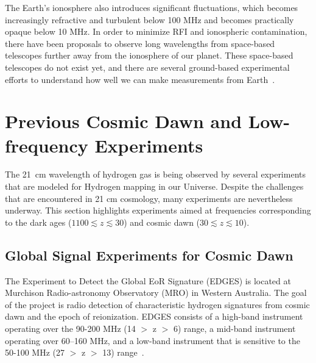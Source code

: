 	    The Earth's ionosphere also introduces significant fluctuations, which becomes increasingly refractive and turbulent below 100 MHz and becomes practically opaque below 10 MHz. In order to minimize RFI and ionospheric contamination, there have been proposals to observe long wavelengths from space-based telescopes further away from the ionosphere of our planet. These space-based telescopes do not exist yet, and there are several ground-based experimental efforts to understand how well we can make measurements from Earth~\citep{2019arXiv190710853C, 2019arXiv190804296K}. 
	    
	    \section{Previous Cosmic Dawn and Low-frequency Experiments}
	    
	    The \SI{21}{cm} wavelength of hydrogen gas is being observed by several experiments that are modeled for Hydrogen mapping in our Universe. Despite the challenges that are encountered in 21 cm cosmology, many experiments are nevertheless underway. This section highlights experiments aimed at frequencies corresponding to the dark ages ($1100 \lesssim z \lesssim 30$) and cosmic dawn ($30 \lesssim z \lesssim 10$).
	    
	    \subsection{Global Signal Experiments for Cosmic Dawn}

            
	    The Experiment to Detect the Global EoR Signature (EDGES) is located at Murchison Radio-astronomy Observatory (MRO) in Western Australia. The goal of the project is radio detection of characteristic hydrogen signatures from cosmic dawn and the epoch of reionization. EDGES consists of a high-band instrument operating over the 90-200 MHz (14 $>$ z $>$ 6) range, a mid-band instrument operating over 60–160 MHz, and a low-band instrument that is sensitive to the 50-100 MHz (27 $>$ z $>$ 13) range~\cite{2017ApJ...835...49M}. 

